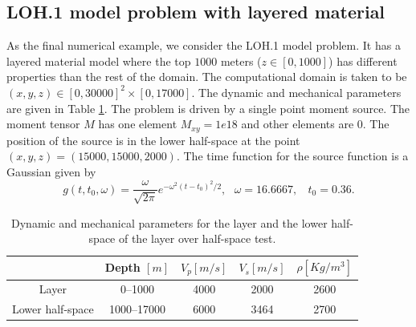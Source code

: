 \subsection{LOH.1 model problem with layered material}
As the final numerical example, we consider the LOH.1 model problem. It has a layered material model where the top $1000$ meters ($z\in[0,1000]$) has different properties than the rest of the domain. The computational domain is taken to be $(x,y,z)\in[0,30000]^2\times[0,17000]$. The dynamic and mechanical parameters are given in Table \ref{material_parameter}. The problem is driven by a single point moment source. The moment tensor $M$ has one element $M_{xy} = 1e18$ and other elements are $0$. The position of the source is in the lower half-space at the point $(x,y,z) = (15000, 15000, 2000)$. The time function for the source function is a Gaussian given by
\[g(t,t_0,\omega) = \frac{\omega}{\sqrt{2\pi}}e^{-\omega^2(t - t_0)^2/2}, \ \ \ \omega = 16.6667,\ \ \ \ t_0 = 0.36.\]

\begin{table}[htbp]
	\begin{center}
		\begin{tabular}{c c c c c}
			\hline
			~   & Depth $[m]$& $V_p[m/s]$ & $V_s [m/s]$ & $\rho[Kg/m^3]$ \\
			\hline
			Layer&0--1000& 4000& 2000& 2600\\
			Lower half-space &1000--17000 & 6000 & 3464& 2700\\
			\hline 
		\end{tabular}
	\end{center}
	\caption{Dynamic and mechanical parameters for the layer and the lower half-space of the layer over half-space test.}\label{material_parameter}
\end{table} 

